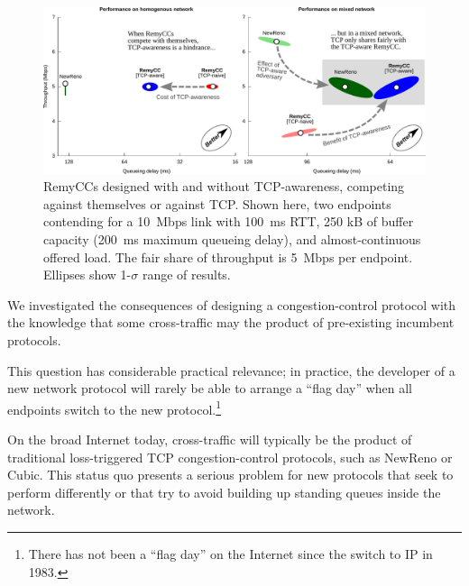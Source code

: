 \begin{figure}[b!]
%
\caption{RemyCCs designed with and without TCP-awareness,
  competing against themselves or against TCP. Shown here, two
  endpoints contending for a 10~Mbps link with 100~ms RTT, 250 kB of
  buffer capacity (200~ms maximum queueing delay), and
  almost-continuous offered load. The fair share of throughput is
  5~Mbps per endpoint. Ellipses show 1-$\sigma$ range of results.}
\label{fig:tcpaware}
\begin{center}
\includegraphics[width=\textwidth]{figures/manual/compatibility-drawn.pdf}
\end{center}
\end{figure}

\label{s:tcpaware}

We investigated the consequences of designing a congestion-control
protocol with the knowledge that some cross-traffic may the product of
pre-existing incumbent protocols.

This question has considerable practical relevance; in practice, the
developer of a new network protocol will rarely be able to arrange a
``flag day'' when all endpoints switch to the new
protocol.\footnote{There has not been a ``flag day'' on the Internet
  since the switch to IP in 1983.}

On the broad Internet today, cross-traffic will typically be the
product of traditional loss-triggered TCP congestion-control
protocols, such as NewReno or Cubic. This status quo presents a
serious problem for new protocols that seek to perform differently or
that try to avoid building up standing queues inside the network.

